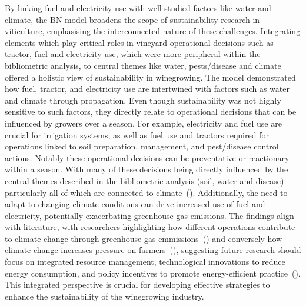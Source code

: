 \documentclass[fleqn,10pt]{wlscirep}
\begin{document}
By linking fuel and electricity use with well-studied factors like water and climate, the BN model broadens the scope of sustainability research in viticulture, emphasising the interconnected nature of these challenges. Integrating elements which play critical roles in vineyard operational decisions such as tractor, fuel and electricity use, which were more peripheral within the bibliometric analysis, to central themes like water, pests/disease and climate offered a holistic view of sustainability in winegrowing. The model demonstrated how fuel, tractor, and electricity use are intertwined with factors such as water and climate through propagation. Even though sustainability was not highly sensitive to such factors, they directly relate to operational decisions that can be influenced by growers over a season. For example, electricity and fuel use are crucial for irrigation systems, as well as fuel use and tractors required for operations linked to soil preparation, management, and pest/disease control actions. Notably these operational decisions can be preventative or reactionary within a season. With many of these decisions being directly influenced by the central themes described in the bibliometric analysis (soil, water and disease) particularly all of which are connected to climate~(\cite{fragaClimateChangeNew2020,tofaloClimateChangeWine2023,naigeonDATADecisionmakingViticulture2023}). Additionally, the need to adapt to changing climate conditions can drive increased use of fuel and electricity, potentially exacerbating greenhouse gas emissions. The findings align with literature, with researchers highlighting how different operations contribute to climate change through greenhouse gas emmissions~(\cite{pilafidisAssessingEnergyUse2023,cechPesticideUseAssociated2022,zhangEstimatingEconomicEnvironmental2019}) and conversely how climate change increases pressure on farmers~(\cite{barnaEditorialImprovingSustainability2023,costaRoleSoilTemperature2023,atakClimateChangeAdaptive2024}), suggesting future research should focus on integrated resource management, technological innovations to reduce energy consumption, and policy incentives to promote energy-efficient practice~(\cite{pereiraViticultureClimateChange2023}). This integrated perspective is crucial for developing effective strategies to enhance the sustainability of the winegrowing industry.
\end{document}

